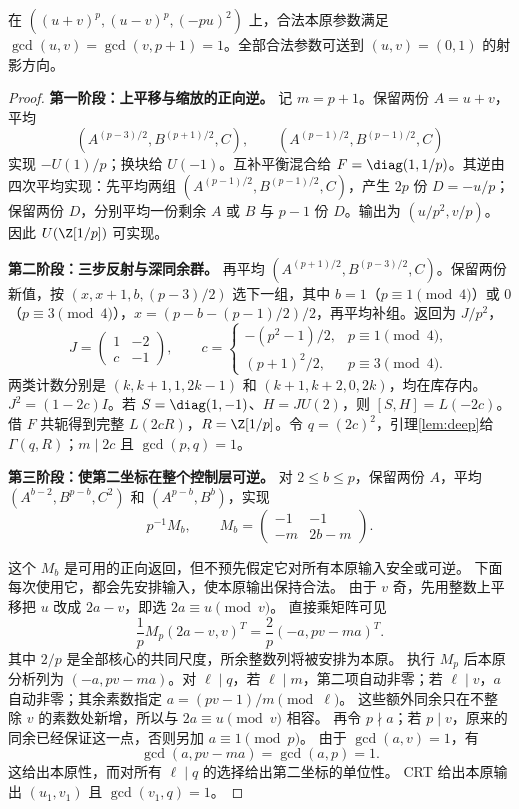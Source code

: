 \begin{lemma}[两次CRT将尺度送到正负1]\label{lem:two-carrier}
在 $((u+v)^p,(u-v)^p,(-pu)^2)$ 上，合法本原参数满足 $\gcd(u,v)=\gcd(v,p+1)=1$。全部合法参数可送到 $(u,v)=(0,1)$ 的射影方向。
\end{lemma}
\begin{proof}

\par\noindent\textbf{第一阶段：上平移与缩放的正向逆。}
记 $m=p+1$。保留两份 $A=u+v$，平均
\[(A^{(p-3)/2},B^{(p+1)/2},C),\qquad
(A^{(p-1)/2},B^{(p-1)/2},C)
\]
实现 $-U(1)/p$；换块给 $U(-1)$。互补平衡混合给 $F=\diag(1,1/p)$。其逆由四次平均实现：先平均两组 $(A^{(p-1)/2},B^{(p-1)/2},C)$，产生 $2p$ 份 $D=-u/p$；保留两份 $D$，分别平均一份剩余 $A$ 或 $B$ 与 $p-1$ 份 $D$。输出为 $(u/p^2,v/p)$。因此 $U(\Z[1/p])$ 可实现。

\par\noindent\textbf{第二阶段：三步反射与深同余群。}
再平均 $(A^{(p+1)/2},B^{(p-3)/2},C)$。保留两份新值，按 $(x,x+1,b,(p-3)/2)$ 选下一组，其中 $b=1$（$p\equiv1\pmod4$）或 $0$（$p\equiv3\pmod4$），$x=(p-b-(p-1)/2)/2$，再平均补组。返回为 $J/p^2$，
\[
J=\begin{pmatrix}1&-2\\c&-1\end{pmatrix},\qquad
c=\begin{cases}-(p^2-1)/2,&p\equiv1\pmod4,\\(p+1)^2/2,&p\equiv3\pmod4.
\end{cases}
\]
两类计数分别是 $(k,k+1,1,2k-1)$ 和 $(k+1,k+2,0,2k)$，均在库存内。$J^2=(1-2c)I$。若 $S=\diag(1,-1)$、$H=JU(2)$，则 $[S,H]=L(-2c)$。借 $F$ 共轭得到完整 $L(2cR)$，$R=\Z[1/p]$。令 $q=(2c)^2$，引理\ref{lem:deep}给 $\Gamma(q,R)$；$m\mid2c$ 且 $\gcd(p,q)=1$。


\par\noindent\textbf{第三阶段：使第二坐标在整个控制层可逆。}
对 $2\le b\le p$，保留两份 $A$，平均 $(A^{b-2},B^{p-b},C^2)$ 和 $(A^{p-b},B^b)$，实现
\[
p^{-1}M_b,\qquad M_b=\begin{pmatrix}-1&-1\\-m&2b-m\end{pmatrix}.
\]

这个 $M_b$ 是可用的正向返回，但不预先假定它对所有本原输入安全或可逆。
下面每次使用它，都会先安排输入，使本原输出保持合法。
由于 $v$ 奇，先用整数上平移把 $u$ 改成 $2a-v$，即选 $2a\equiv u\pmod v$。
直接乘矩阵可见
\[
\frac1pM_p(2a-v,v)^T=\frac2p(-a,pv-ma)^T.
\]
其中 $2/p$ 是全部核心的共同尺度，所余整数列将被安排为本原。
执行 $M_p$ 后本原分析列为 $(-a,pv-ma)$。对 $\ell\mid q$，若 $\ell\mid m$，第二项自动非零；若 $\ell\mid v$，$a$ 自动非零；其余素数指定 $a=(pv-1)/m\pmod\ell$。
这些额外同余只在不整除 $v$ 的素数处新增，所以与 $2a\equiv u\pmod v$ 相容。
再令 $p\nmid a$；若 $p\mid v$，原来的同余已经保证这一点，否则另加 $a\equiv1\pmod p$。
由于 $\gcd(a,v)=1$，有
\[
\gcd(a,pv-ma)=\gcd(a,p)=1.
\]
这给出本原性，而对所有 $\ell\mid q$ 的选择给出第二坐标的单位性。
CRT 给出本原输出 $(u_1,v_1)$ 且 $\gcd(v_1,q)=1$。


\end{proof}
